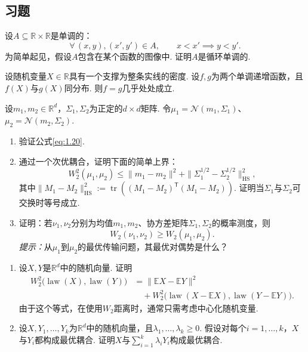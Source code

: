 \subsection{习题}\label{sec:1.8}

\begin{exercise}\label{exer:1}\label{exer:1.1}
设$A\subseteq\mathbb R\times\mathbb R$是单调的：
$$
\forall\,(x,y),(x',y')\in A,\qquad x<x'\implies y<y'.
$$
为简单起见，假设$A$包含在某个函数的图像中. 证明$A$是循环单调的.
\end{exercise}

\begin{exercise}\label{exer:2}\label{exer:1.2}
设随机变量$X\in\mathbb R$具有一个支撑为整条实线的密度. 设$f,g$为两个单调递增函数，且$f(X)$与$g(X)$同分布. 则$f=g$几乎处处成立.
\end{exercise}

\begin{exercise}\label{exer:3}\label{exer:1.3}
设$m_1,m_2\in\mathbb R^d$，$\Sigma_1,\Sigma_2$为正定的$d\times d$矩阵. 令$\mu_1=\mathcal N(m_1,\Sigma_1)$、$\mu_2=\mathcal N(m_2,\Sigma_2)$.
\begin{enumerate}
\renewcommand{\labelenumi}{(\alph{enumi})}
\item 验证公式\eqref{eq:1.20}.
\item 通过一个次优耦合，证明下面的简单上界：
$$
W_2^2(\mu_1,\mu_2)\leq\|m_1-m_2\|^2+
\|\Sigma_1^{1/2}-\Sigma_2^{1/2}\|_{\mathrm{HS}}^2,
$$
其中$\|M_1-M_2\|_{\mathrm{HS}}^2:=\operatorname{tr}((M_1-M_2)^{\mathsf T}(M_1-M_2))$. 证明当$\Sigma_1$与$\Sigma_2$可交换时等号成立.
\item 证明：若$\nu_1,\nu_2$分别为均值$m_1,m_2$、协方差矩阵$\Sigma_1,\Sigma_2$的概率测度，则
$$
W_2(\nu_1,\nu_2)\geq W_2(\mu_1,\mu_2).
$$
\emph{提示：}从$\mu_1$到$\mu_2$的最优传输问题，其最优对偶势是什么？
\end{enumerate}
\end{exercise}

\begin{exercise}\label{exer:4}\label{exer:1.4}\leavevmode
\begin{enumerate}
\renewcommand{\labelenumi}{(\alph{enumi})}
\item 设$X,Y$是$\mathbb R^d$中的随机向量. 证明
$$
\begin{aligned}
W_2^2\bigl(\operatorname{law}(X),\operatorname{law}(Y)\bigr)
&=\|\mathbb EX-\mathbb EY\|^2\\
&\quad+W_2^2\bigl(\operatorname{law}(X-\mathbb EX),
\operatorname{law}(Y-\mathbb EY)\bigr).
\end{aligned}
$$
由于这个等式，在使用$W_2$距离时，通常只需考虑中心化随机变量.
\item 设$X,Y_1,\ldots,Y_k$为$\mathbb R^d$中的随机向量，且$\lambda_1,\ldots,\lambda_k\geq0$. 假设对每个$i=1,\ldots,k$，$X$与$Y_i$都构成最优耦合. 证明$X$与$\sum_{i=1}^k\lambda_iY_i$构成最优耦合.
\end{enumerate}
\end{exercise}

